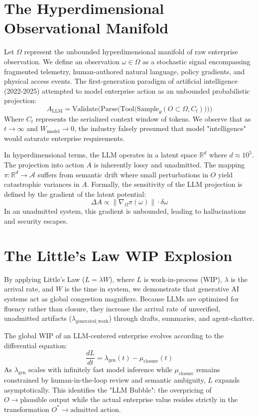 \documentclass[12pt,a4paper,oneside]{book}
\begin{document}
\section{The Hyperdimensional Observational Manifold}
Let $\Omega$ represent the unbounded hyperdimensional manifold of raw enterprise observation. We define an observation $\omega \in \Omega$ as a stochastic signal encompassing fragmented telemetry, human-authored natural language, policy gradients, and physical access events. The first-generation paradigm of artificial intelligence (2022-2025) attempted to model enterprise action as an unbounded probabilistic projection:
\begin{equation}
A_{\text{LLM}} = \text{Validate}\Big(\text{Parse}\Big(\text{Tool}\Big(\text{Sample}_{\theta}(O \subset \Omega, C_t)\Big)\Big)\Big)
\end{equation}
Where $C_t$ represents the serialized context window of tokens. We observe that as $t \to \infty$ and $W_{\text{model}} \to 0$, the industry falsely presumed that model "intelligence" would saturate enterprise requirements. 

In hyperdimensional terms, the LLM operates in a latent space $\mathbb{R}^d$ where $d \approx 10^5$. The projection into action $A$ is inherently lossy and unadmitted. The mapping $\pi: \mathbb{R}^d \to \mathcal{A}$ suffers from semantic drift where small perturbations in $O$ yield catastrophic variances in $A$. Formally, the sensitivity of the LLM projection is defined by the gradient of the latent potential:
\begin{equation}
\Delta A \propto \| \nabla_{\Omega} \pi(\omega) \| \cdot \delta \omega
\end{equation}
In an unadmitted system, this gradient is unbounded, leading to hallucinations and security escapes.

\section{The Little's Law WIP Explosion}
By applying Little's Law ($L = \lambda W$), where $L$ is work-in-process (WIP), $\lambda$ is the arrival rate, and $W$ is the time in system, we demonstrate that generative AI systems act as global congestion magnifiers. Because LLMs are optimized for fluency rather than closure, they increase the arrival rate of unverified, unadmitted artifacts ($\lambda_{\text{generated\_work}}$) through drafts, summaries, and agent-chatter. 

The global WIP of an LLM-centered enterprise evolves according to the differential equation:
\begin{equation}
\frac{dL}{dt} = \lambda_{\text{gen}}(t) - \mu_{\text{closure}}(t)
\end{equation}
As $\lambda_{\text{gen}}$ scales with infinitely fast model inference while $\mu_{\text{closure}}$ remains constrained by human-in-the-loop review and semantic ambiguity, $L$ expands asymptotically. This identifies the "LLM Bubble": the overpricing of $O \to \text{plausible output}$ while the actual enterprise value resides strictly in the transformation $O^* \to \text{admitted action}$.
\end{document}
